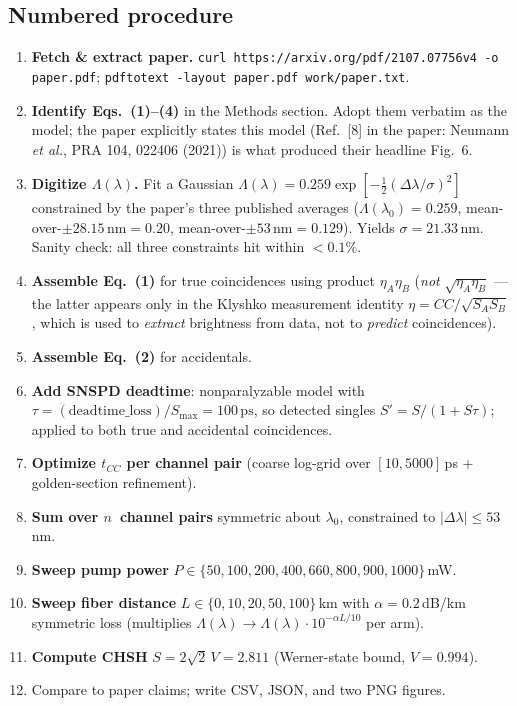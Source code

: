 \documentclass[11pt]{article}
\begin{document}
\subsection{Numbered procedure}
\begin{enumerate}
\item \textbf{Fetch \& extract paper.} \texttt{curl https://arxiv.org/pdf/2107.07756v4 -o paper.pdf};
      \texttt{pdftotext -layout paper.pdf work/paper.txt}.
\item \textbf{Identify Eqs.~(1)--(4)} in the Methods section. Adopt them
      verbatim as the model; the paper explicitly states this model
      (Ref.~[8] in the paper: Neumann \emph{et al.}, PRA 104, 022406 (2021))
      is what produced their headline Fig.~6.
\item \textbf{Digitize $\Lambda(\lambda)$.} Fit a Gaussian
      $\Lambda(\lambda)=0.259\exp[-\tfrac{1}{2}(\Delta\lambda/\sigma)^{2}]$
      constrained by the paper's three published averages
      ($\Lambda(\lambda_{0}){=}0.259$, mean-over-$\pm 28.15$\,nm${=}0.20$,
      mean-over-$\pm 53$\,nm${=}0.129$). Yields $\sigma=21.33$\,nm.
      Sanity check: all three constraints hit within $<0.1\%$.
\item \textbf{Assemble Eq.~(1)} for true coincidences using product $\eta_A\eta_B$
      (\emph{not} $\sqrt{\eta_A\eta_B}$ --- the latter appears only in the
      Klyshko measurement identity $\eta=CC/\sqrt{S_A S_B}$, which is used to
      \emph{extract} brightness from data, not to \emph{predict} coincidences).
\item \textbf{Assemble Eq.~(2)} for accidentals.
\item \textbf{Add SNSPD deadtime}: nonparalyzable model with
      $\tau=(\mathrm{deadtime\_loss})/S_{\max}=100\,\mathrm{ps}$, so
      detected singles $S'=S/(1+S\tau)$; applied to both true and accidental
      coincidences.
\item \textbf{Optimize $t_{CC}$ per channel pair} (coarse log-grid over
      $[10,5000]$\,ps + golden-section refinement).
\item \textbf{Sum over $n$~channel pairs} symmetric about $\lambda_{0}$,
      constrained to $|\Delta\lambda|\leq 53$\,nm.
\item \textbf{Sweep pump power} $P\in\{50,100,200,400,660,800,900,1000\}$\,mW.
\item \textbf{Sweep fiber distance} $L\in\{0,10,20,50,100\}$\,km with
      $\alpha=0.2$\,dB/km symmetric loss (multiplies $\Lambda(\lambda)\to
      \Lambda(\lambda)\cdot 10^{-\alpha L/10}$ per arm).
\item \textbf{Compute CHSH} $S=2\sqrt{2}\,V=2.811$ (Werner-state bound,
      $V=0.994$).
\item Compare to paper claims; write CSV, JSON, and two PNG figures.
\end{enumerate}
\end{document}
